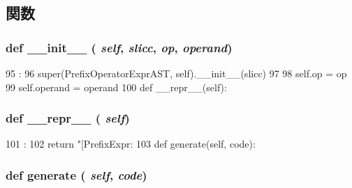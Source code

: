 \subsection{関数}
\hypertarget{classslicc_1_1ast_1_1OperatorExprAST_1_1PrefixOperatorExprAST_ac775ee34451fdfa742b318538164070e}{
\subsubsection[{\_\-\_\-init\_\-\_\-}]{\setlength{\rightskip}{0pt plus 5cm}def \_\-\_\-init\_\-\_\- ( {\em self}, \/   {\em slicc}, \/   {\em op}, \/   {\em operand})}}
\label{classslicc_1_1ast_1_1OperatorExprAST_1_1PrefixOperatorExprAST_ac775ee34451fdfa742b318538164070e}



\begin{DoxyCode}
95                                           :
96         super(PrefixOperatorExprAST, self).__init__(slicc)
97 
98         self.op = op
99         self.operand = operand
100 
    def __repr__(self):
\end{DoxyCode}
\hypertarget{classslicc_1_1ast_1_1OperatorExprAST_1_1PrefixOperatorExprAST_ad8b9328939df072e4740cd9a63189744}{
\subsubsection[{\_\-\_\-repr\_\-\_\-}]{\setlength{\rightskip}{0pt plus 5cm}def \_\-\_\-repr\_\-\_\- ( {\em self})}}
\label{classslicc_1_1ast_1_1OperatorExprAST_1_1PrefixOperatorExprAST_ad8b9328939df072e4740cd9a63189744}



\begin{DoxyCode}
101                       :
102         return "[PrefixExpr: %
103 
    def generate(self, code):
\end{DoxyCode}
\hypertarget{classslicc_1_1ast_1_1OperatorExprAST_1_1PrefixOperatorExprAST_a4555d1cee0dccf3942ea35fe86de2e8e}{
\subsubsection[{generate}]{\setlength{\rightskip}{0pt plus 5cm}def generate ( {\em self}, \/   {\em code})}}
\label{classslicc_1_1ast_1_1OperatorExprAST_1_1PrefixOperatorExprAST_a4555d1cee0dccf3942ea35fe86de2e8e}



